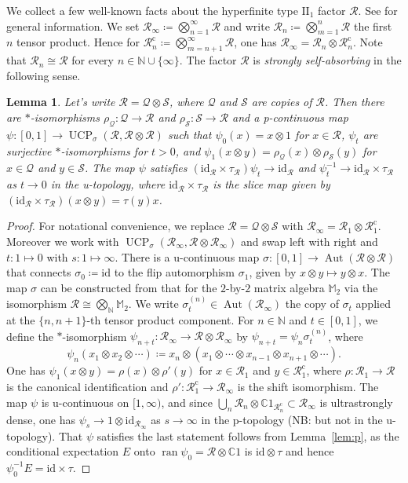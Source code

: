 \documentclass[12pt,nosumlimits,nonamelimits]{amsart}
\newtheorem{lem}[thm]{Lemma}
\theoremstyle{remark}
\newcommand{\IC}{\mathbb{C}}
\newcommand{\IM}{\mathbb{M}}
\newcommand{\IN}{\mathbb{N}}
\newcommand{\cQ}{\mathcal{Q}}
\newcommand{\cR}{\mathcal{R}}
\newcommand{\cS}{\mathcal{S}}
\newcommand{\id}{\mathrm{id}}
\DeclareMathOperator{\Aut}{Aut}
\DeclareMathOperator{\ran}{ran}
\DeclareMathOperator{\UCP}{UCP}
\begin{document}
We collect a few well-known facts about 
the hyperfinite type $\mathrm{II}_1$ factor $\cR$. 
See \cite{takesakiIII} for general information.
We set $\cR_\infty\coloneqq\bigotimes_{n=1}^\infty\cR$ and 
write $\cR_n\coloneqq\bigotimes_{m=1}^n\cR$ the first $n$ tensor product. 
Hence for $\cR_n^{\mathrm{c}}\coloneqq\bigotimes_{m=n+1}^\infty\cR$, 
one has $\cR_\infty=\cR_n\otimes\cR_n^{\mathrm{c}}$.
Note that $\cR_n\cong\cR$ for every $n\in\IN\cup\{\infty\}$. 
The factor $\cR$ is 
\emph{strongly self-absorbing} in the following sense. 

\begin{lem}\label{lem:ssa}
Let's write $\cR=\cQ\otimes\cS$, 
where $\cQ$ and $\cS$ are copies of $\cR$.  
Then there are $*$-iso\-mor\-phisms 
$\rho_{\cQ} \colon\cQ\to\cR$ and $\rho_{\cS}\colon \cS\to\cR$ 
and a p-con\-ti\-nuous map 
$\psi\colon[0,1]\to\UCP_\sigma(\cR,\cR\otimes\cR)$ 
such that $\psi_0(x)=x\otimes 1$ for $x\in\cR$, 
$\psi_t$ are surjective $*$-iso\-mor\-phisms for $t>0$, 
and $\psi_1(x\otimes y)=\rho_{\cQ}(x)\otimes\rho_{\cS}(y)$ 
for $x\in\cQ$ and $y\in\cS$. 
The map $\psi$ satisfies 
$(\id_{\cR}\times\tau_{\cR})\psi_t\to\id_{\cR}$ 
and $\psi_t^{-1}\to\id_{\cR}\times\tau_{\cR}$ 
as $t\to0$ in the u-topo\-logy, 
where $\id_{\cR}\times\tau_{\cR}$ is the slice map 
given by $(\id_{\cR}\times\tau_{\cR})(x\otimes y)=\tau(y)x$. 
\end{lem}
\begin{proof}
For notational convenience, we replace $\cR=\cQ\otimes\cS$ 
with $\cR_\infty = \cR_1\otimes\cR_1^{\mathrm{c}}$. 
Moreover we work with 
$\UCP_\sigma(\cR_\infty,\cR\otimes\cR_\infty)$ 
and swap left with right 
and $t\colon 1\mapsto0$ with $s\colon1\mapsto\infty$. 
There is a u-continuous map 
$\sigma\colon [0,1]\to\Aut(\cR\otimes\cR)$ 
that connects $\sigma_0\coloneqq\id$ to the flip automorphism 
$\sigma_1$, given by $x\otimes y\mapsto y\otimes x$.
The map $\sigma$ can be constructed from that for 
the $2$-by-$2$ matrix algebra $\IM_2$ 
via the isomorphism $\cR\cong\bigotimes_{\IN}\IM_2$. 
We write $\sigma^{(n)}_t\in\Aut(\cR_\infty)$ 
the copy of $\sigma_t$ applied 
at the $\{n,n+1\}$-th tensor product component. 
For $n\in\IN$ and $t\in[0,1]$, 
we define the $*$-iso\-mor\-phism 
$\psi_{n+t}\colon \cR_\infty\to\cR\otimes\cR_\infty$ by 
$\psi_{n+t}=\psi_n\sigma^{(n)}_t$, where
\[
\psi_n(x_1\otimes x_2\otimes\cdots)
 \coloneqq x_n \otimes (x_1\otimes\cdots\otimes x_{n-1}\otimes x_{n+1}\otimes\cdots).
\]
One has $\psi_1(x\otimes y)=\rho(x) \otimes \rho'(y)$ for 
$x\in \cR_1$ and $y\in\cR_1^{\mathrm{c}}$, where 
$\rho\colon\cR_1\to\cR$ is the canonical identification and 
$\rho'\colon\cR_1^{\mathrm{c}}\to\cR_\infty$ 
is the shift isomorphism. 
The map $\psi$ is u-con\-ti\-nuous on $[1,\infty)$, and 
since $\bigcup_n \cR_n\otimes\IC1_{\cR_n^\mathrm{c}}\subset\cR_\infty$ 
is ultrastrongly dense, one has 
$\psi_s\to1\otimes\id_{\cR_\infty}$ as $s\to\infty$ 
in the p-topo\-logy 
(NB: but not in the u-topo\-logy).
That $\psi$ satisfies the last statement 
follows from Lemma~\ref{lem:p}, as 
the conditional expectation $E$ 
onto $\ran\psi_0 = \cR\otimes\IC1$ 
is $\id\otimes\tau$ and 
hence $\psi_0^{-1}E=\id\times\tau$. 
\end{proof}
\end{document}

